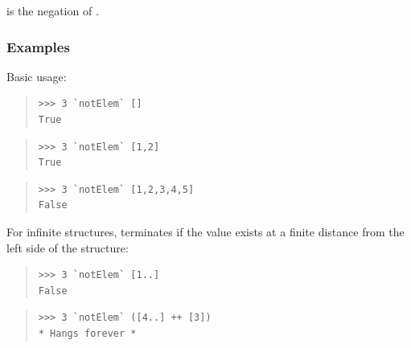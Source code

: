 \begin{haddockdesc}
\item[\begin{tabular}{@{}l}
notElem :: (Foldable t, Eq a) => a -> t a -> Bool
\end{tabular}]
{\haddockbegindoc
{} is the negation of .\par
\subsubsection*{\textbf{Examples}}
Basic usage:\par
\begin{quote}
{\haddockverb\begin{verbatim}
>>> 3 `notElem` []
True

\end{verbatim}}
\end{quote}
\begin{quote}
{\haddockverb\begin{verbatim}
>>> 3 `notElem` [1,2]
True

\end{verbatim}}
\end{quote}
\begin{quote}
{\haddockverb\begin{verbatim}
>>> 3 `notElem` [1,2,3,4,5]
False

\end{verbatim}}
\end{quote}
For infinite structures,  terminates if the value exists at a
 finite distance from the left side of the structure:\par
\begin{quote}
{\haddockverb\begin{verbatim}
>>> 3 `notElem` [1..]
False

\end{verbatim}}
\end{quote}
\begin{quote}
{\haddockverb\begin{verbatim}
>>> 3 `notElem` ([4..] ++ [3])
* Hangs forever *

\end{verbatim}}
\end{quote}}
\end{haddockdesc}
